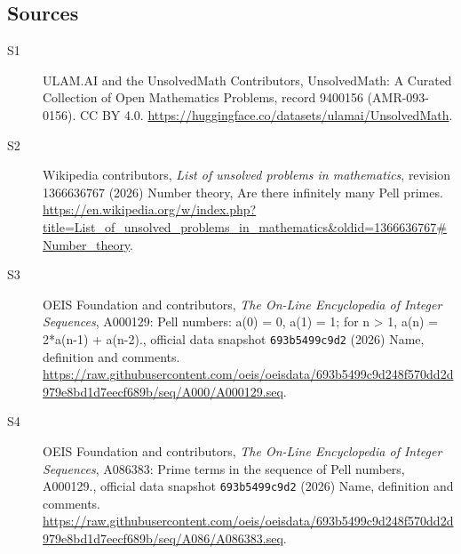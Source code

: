 \documentclass[11pt]{article}
\begin{document}
\subsection{Sources}
\begin{description}
\item[\hypertarget{source:9400156:1}{S1}] ULAM.AI and the UnsolvedMath Contributors, UnsolvedMath: A Curated Collection of Open Mathematics Problems, record 9400156 (AMR-093-0156). CC BY 4.0. \url{https://huggingface.co/datasets/ulamai/UnsolvedMath}.
\item[\hypertarget{source:9400156:2}{S2}] Wikipedia contributors, \emph{List of unsolved problems in mathematics}, revision 1366636767 (2026) Number theory, Are there infinitely many Pell primes. \url{https://en.wikipedia.org/w/index.php?title=List_of_unsolved_problems_in_mathematics&oldid=1366636767#Number_theory}.
\item[\hypertarget{source:9400156:3}{S3}] OEIS Foundation and contributors, \emph{The On-Line Encyclopedia of Integer Sequences}, A000129: Pell numbers: a(0) = 0, a(1) = 1; for n > 1, a(n) = 2*a(n-1) + a(n-2)., official data snapshot \texttt{693b5499c9d2} (2026) Name, definition and comments. \url{https://raw.githubusercontent.com/oeis/oeisdata/693b5499c9d248f570dd2d979e8bd1d7eecf689b/seq/A000/A000129.seq}.
\item[\hypertarget{source:9400156:4}{S4}] OEIS Foundation and contributors, \emph{The On-Line Encyclopedia of Integer Sequences}, A086383: Prime terms in the sequence of Pell numbers, A000129., official data snapshot \texttt{693b5499c9d2} (2026) Name, definition and comments. \url{https://raw.githubusercontent.com/oeis/oeisdata/693b5499c9d248f570dd2d979e8bd1d7eecf689b/seq/A086/A086383.seq}.
\end{description}
\label{end:9400156}
\end{document}

